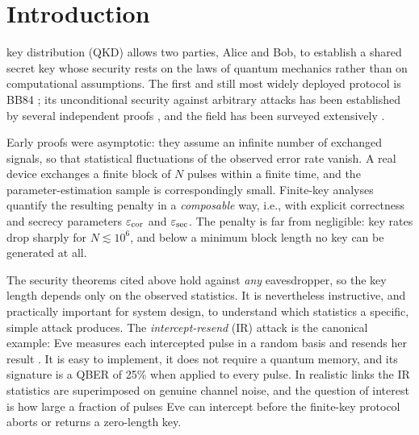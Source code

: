 \section{Introduction}
 key distribution (QKD) allows two parties, Alice and Bob, to establish a shared secret key whose security rests on the laws of quantum mechanics rather than on computational assumptions. The first and still most widely deployed protocol is BB84 \cite{BB84}; its unconditional security against arbitrary attacks has been established by several independent proofs \cite{LoChau99,Mayers01,ShorPreskill00,Renner05}, and the field has been surveyed extensively \cite{Scarani09,Xu20,Pirandola20}.

Early proofs were asymptotic: they assume an infinite number of exchanged signals, so that statistical fluctuations of the observed error rate vanish. A real device exchanges a finite block of $N$ pulses within a finite time, and the parameter-estimation sample is correspondingly small. Finite-key analyses \cite{CaiScarani09,Tomamichel12,HayashiTsurumaru12,Lim14} quantify the resulting penalty in a \emph{composable} way, i.e., with explicit correctness and secrecy parameters $\varepsilon_{\mathrm{cor}}$ and $\varepsilon_{\mathrm{sec}}$. The penalty is far from negligible: key rates drop sharply for $N\lesssim 10^{6}$, and below a minimum block length no key can be generated at all.

The security theorems cited above hold against \emph{any} eavesdropper, so the key length depends only on the observed statistics. It is nevertheless instructive, and practically important for system design, to understand which statistics a specific, simple attack produces. The \emph{intercept-resend} (IR) attack is the canonical example: Eve measures each intercepted pulse in a random basis and resends her result \cite{BB84,Fuchs97}. It is easy to implement, it does not require a quantum memory, and its signature is a QBER of 25\% when applied to every pulse. In realistic links the IR statistics are superimposed on genuine channel noise, and the question of interest is how large a fraction of pulses Eve can intercept before the finite-key protocol aborts or returns a zero-length key.

